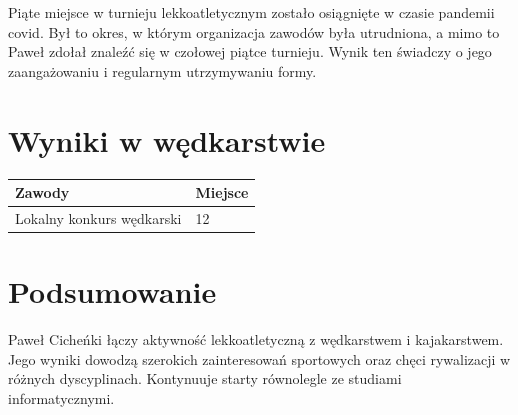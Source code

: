 Piąte miejsce w turnieju lekkoatletycznym zostało osiągnięte w czasie pandemii covid. Był to okres, w którym organizacja zawodów była utrudniona, a mimo to Paweł zdołał znaleźć się w czołowej piątce turnieju. Wynik ten świadczy o jego zaangażowaniu i regularnym utrzymywaniu formy.

\section*{Wyniki w wędkarstwie}
\begin{tabularx}{\textwidth}{@{}Xl@{}}
\toprule
\textbf{Zawody} & \textbf{Miejsce} \\
\midrule
Lokalny konkurs wędkarski & 12 \\
\bottomrule
\end{tabularx}

\vspace{0.4cm}

\section*{Podsumowanie}
Paweł Cicheńki łączy aktywność lekkoatletyczną z wędkarstwem i kajakarstwem. Jego wyniki dowodzą szerokich zainteresowań sportowych oraz chęci rywalizacji w różnych dyscyplinach. Kontynuuje starty równolegle ze studiami informatycznymi.